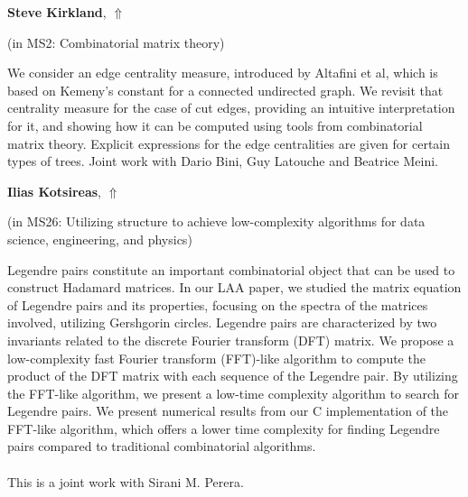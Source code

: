 \documentclass[ILAS2025-program.tex]{subfiles}
\begin{document}
\hypertarget{down0295}{}\begin{ilasabstract}
    
\textbf{Steve Kirkland},  \hfill \hyperlink{up0295}{$\Uparrow$}
    
    
(in {\color{mstitle}MS2: Combinatorial matrix theory})
        
\mtskip
    We consider an edge centrality measure, introduced by Altafini et al, which is based on Kemeny's constant for a connected undirected graph. We revisit that centrality measure for the case of cut edges, providing an intuitive  interpretation for it, and showing how it can be computed using tools from combinatorial matrix theory. Explicit expressions for the edge centralities are given for certain types of trees. Joint work with Dario Bini, Guy Latouche and Beatrice Meini.  

\end{ilasabstract}
    

\hypertarget{down0135}{}\begin{ilasabstract}
    
\textbf{Ilias Kotsireas},  \hfill \hyperlink{up0135}{$\Uparrow$}
    
    
(in {\color{mstitle}MS26: Utilizing structure to achieve low-complexity algorithms for data science, engineering, and physics})
        
\mtskip
    Legendre pairs constitute an important combinatorial object that can be used to construct Hadamard matrices. 
In our LAA paper, we studied the matrix equation of Legendre pairs and its properties, focusing on the spectra of the matrices involved, utilizing Gershgorin circles. Legendre pairs are characterized by two invariants related to the discrete Fourier transform (DFT) matrix. We propose a low-complexity fast Fourier transform (FFT)-like algorithm to compute the product of the DFT matrix with each sequence of the Legendre pair. By utilizing the FFT-like algorithm, we present a low-time complexity algorithm to search for Legendre pairs. We present numerical results from our C implementation of the FFT-like algorithm, which offers a lower time complexity for finding Legendre pairs compared to traditional combinatorial algorithms. 
\\\\
This is a joint work with Sirani M. Perera.

\end{ilasabstract}
    
\end{document}
